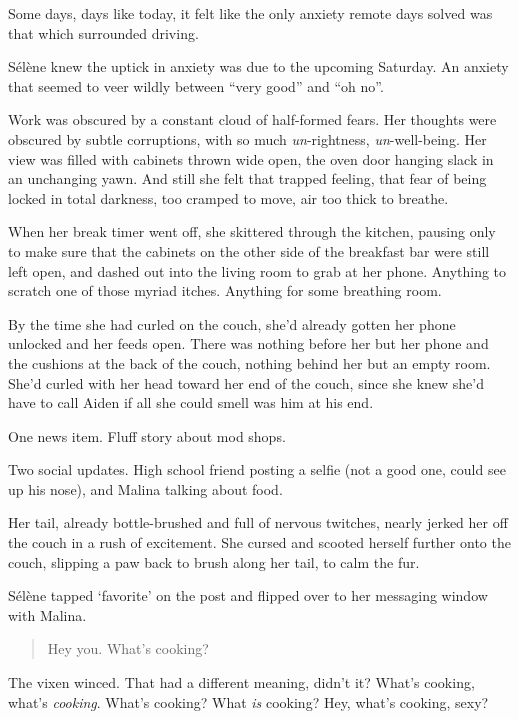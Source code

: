 Some days, days like today, it felt like the only anxiety remote days solved was that which surrounded driving.

Sélène knew the uptick in anxiety was due to the upcoming Saturday. An anxiety that seemed to veer wildly between ``very good'' and ``oh no''.

Work was obscured by a constant cloud of half-formed fears. Her thoughts were obscured by subtle corruptions, with so much \emph{un}-rightness, \emph{un}-well-being. Her view was filled with cabinets thrown wide open, the oven door hanging slack in an unchanging yawn. And still she felt that trapped feeling, that fear of being locked in total darkness, too cramped to move, air too thick to breathe.

When her break timer went off, she skittered through the kitchen, pausing only to make sure that the cabinets on the other side of the breakfast bar were still left open, and dashed out into the living room to grab at her phone. Anything to scratch one of those myriad itches. Anything for some breathing room.

By the time she had curled on the couch, she'd already gotten her phone unlocked and her feeds open. There was nothing before her but her phone and the cushions at the back of the couch, nothing behind her but an empty room. She'd curled with her head toward her end of the couch, since she knew she'd have to call Aiden if all she could smell was him at his end.

One news item. Fluff story about mod shops.

Two social updates. High school friend posting a selfie (not a good one, could see up his nose), and Malina talking about food.

Her tail, already bottle-brushed and full of nervous twitches, nearly jerked her off the couch in a rush of excitement. She cursed and scooted herself further onto the couch, slipping a paw back to brush along her tail, to calm the fur.

Sélène tapped `favorite' on the post and flipped over to her messaging window with Malina.

\begin{quote}
Hey you. What's cooking?
\end{quote}

The vixen winced. That had a different meaning, didn't it? What's cooking, what's \emph{cooking}. What's cooking? What \emph{is} cooking? Hey, what's cooking, sexy?

